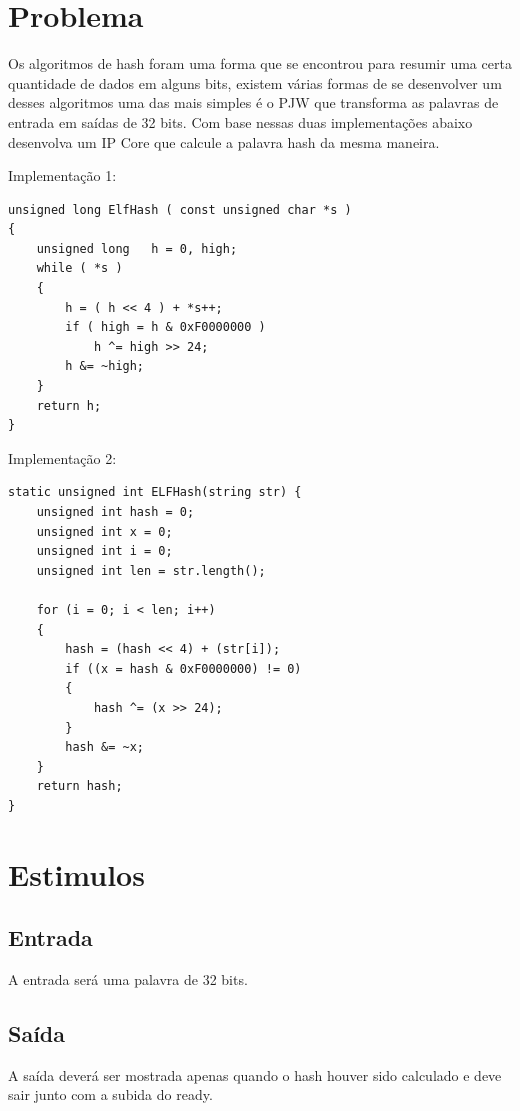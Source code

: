 \documentclass[
    12pt,
    a4paper,
    oneside,
    chapter=TITLE,
    section=TITLE,
    subsection=TITLE,
    subsubsection=TITLE,
    english,
    french,
    spanish,
    brazil,
    ]{abntex2}
\begin{document}
\frenchspacing 
\imprimircapa
\imprimirfolhaderosto

\tableofcontents*
\cleardoublepage

\textual

\chapter{Problema}
Os algoritmos de hash foram uma forma que se encontrou para resumir uma certa quantidade de dados em alguns bits, existem várias formas de se desenvolver um desses algoritmos uma das mais simples é o PJW que transforma as palavras de entrada em saídas de 32 bits. Com base nessas duas implementações abaixo desenvolva um IP Core que calcule a palavra hash da mesma maneira.

\par
Implementação 1:
\begin{lstlisting}
unsigned long ElfHash ( const unsigned char *s )
{
    unsigned long   h = 0, high;
    while ( *s )
    {
        h = ( h << 4 ) + *s++;
        if ( high = h & 0xF0000000 )
            h ^= high >> 24;
        h &= ~high;
    }
    return h;
}
\end{lstlisting}

\par
Implementação 2:
\begin{lstlisting}
static unsigned int ELFHash(string str) {
    unsigned int hash = 0;
    unsigned int x = 0;
    unsigned int i = 0;
    unsigned int len = str.length();

    for (i = 0; i < len; i++)
    {
        hash = (hash << 4) + (str[i]);
        if ((x = hash & 0xF0000000) != 0)
        {
            hash ^= (x >> 24);
        }
        hash &= ~x;
    }
    return hash;
}
\end{lstlisting}



\chapter{Estimulos}
\section{Entrada}
A entrada será uma palavra de 32 bits.

\section{Saída}
A saída deverá ser mostrada apenas quando o hash houver sido calculado e deve sair junto com a subida do ready.
\end{document}
